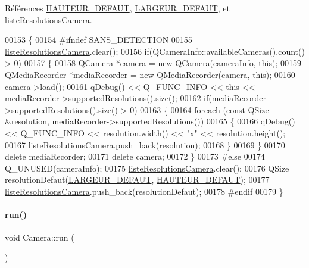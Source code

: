 Références \hyperlink{camera_8h_source_l00041}{H\+A\+U\+T\+E\+U\+R\+\_\+\+D\+E\+F\+A\+UT}, \hyperlink{camera_8h_source_l00035}{L\+A\+R\+G\+E\+U\+R\+\_\+\+D\+E\+F\+A\+UT}, et \hyperlink{camera_8h_source_l00071}{liste\+Resolutions\+Camera}.


\begin{DoxyCode}
00153 \{
00154 \textcolor{preprocessor}{    #ifndef SANS\_DETECTION}
00155     \hyperlink{class_camera_a96af62eaf7828664865b56e7c69e771c}{listeResolutionsCamera}.clear();
00156     \textcolor{keywordflow}{if}(QCameraInfo::availableCameras().count() > 0)
00157     \{
00158         QCamera *camera = \textcolor{keyword}{new} QCamera(cameraInfo, \textcolor{keyword}{this});
00159         QMediaRecorder *mediaRecorder = \textcolor{keyword}{new} QMediaRecorder(camera, \textcolor{keyword}{this});
00160         camera->load();
00161         qDebug() << Q\_FUNC\_INFO << \textcolor{keyword}{this} << mediaRecorder->supportedResolutions().size();
00162         \textcolor{keywordflow}{if}(mediaRecorder->supportedResolutions().size() > 0)
00163         \{
00164             \textcolor{keywordflow}{foreach} (\textcolor{keyword}{const} QSize &resolution, mediaRecorder->supportedResolutions())
00165             \{
00166                 qDebug() << Q\_FUNC\_INFO << resolution.width() << \textcolor{stringliteral}{"x"} << resolution.height();
00167                 \hyperlink{class_camera_a96af62eaf7828664865b56e7c69e771c}{listeResolutionsCamera}.push\_back(resolution);
00168             \}
00169         \}
00170         \textcolor{keyword}{delete} mediaRecorder;
00171         \textcolor{keyword}{delete} camera;
00172     \}
00173 \textcolor{preprocessor}{    #else}
00174     Q\_UNUSED(cameraInfo);
00175     \hyperlink{class_camera_a96af62eaf7828664865b56e7c69e771c}{listeResolutionsCamera}.clear();
00176     QSize resolutionDefaut(\hyperlink{camera_8h_afe66edd1ec0aa05058aaa2a069248f65}{LARGEUR\_DEFAUT}, \hyperlink{camera_8h_a70cf269dc21e5a921c2927034d6cadd2}{HAUTEUR\_DEFAUT});
00177     \hyperlink{class_camera_a96af62eaf7828664865b56e7c69e771c}{listeResolutionsCamera}.push\_back(resolutionDefaut);
00178 \textcolor{preprocessor}{    #endif}
00179 \}
\end{DoxyCode}
\mbox{\label{class_camera_aaa3745c0cf0f286ef80b7eeebc248cc9}} 
\paragraph{\texorpdfstring{run()}{run()}}
{\footnotesize\ttfamily void Camera\+::run (\begin{DoxyParamCaption}{ }\end{DoxyParamCaption})}



